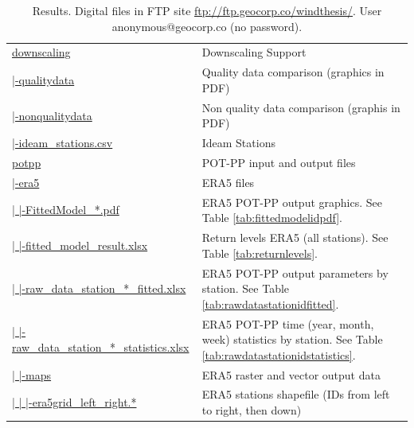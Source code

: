 \documentclass[12pt,oneside]{reedthesis}
\begin{document}
\begingroup\fontsize{8}{10}\selectfont
\begin{longtable}[t]{>{\raggedright\arraybackslash}p{2.2in}>{\raggedright\arraybackslash}p{4in}}
\caption[Results. Digital files]{\label{tab:resultsstructure}Results. Digital files in FTP site \href{ftp://ftp.geocorp.co/windthesis/}{ftp://ftp.geocorp.co/windthesis/}. User anonymous@geocorp.co (no password).}\\
\toprule
\multicolumn{1}{l}{Folder Tree - Ftp Links} & \multicolumn{1}{l}{Description}\\
\midrule
\href{ftp://ftp.geocorp.co/windthesis/downscaling/}{downscaling} & Downscaling Support\\
\href{ftp://ftp.geocorp.co/windthesis/downscaling/qualitydata/}{  |-qualitydata} & Quality data comparison (graphics in PDF)\\
\href{ftp://ftp.geocorp.co/windthesis/downscaling/nonqualitydata/}{  |-nonqualitydata} & Non quality data comparison (graphis in PDF)\\
\href{ftp://ftp.geocorp.co/windthesis/downscaling/ideam_stations.csv}{  |-ideam\_stations.csv} & Ideam Stations\\
\href{ftp://ftp.geocorp.co/windthesis/potpp/}{potpp} & POT-PP input and output files\\
\href{ftp://ftp.geocorp.co/windthesis/potpp/era5/}{  |-era5} & ERA5 files\\
\href{ftp://ftp.geocorp.co/windthesis/potpp/era5/}{  |    |-FittedModel\_*.pdf} & ERA5 POT-PP output graphics. See Table \ref{tab:fittedmodelidpdf}.\\
\href{ftp://ftp.geocorp.co/windthesis/potpp/era5/fitted_model_result_PoissonProcessGumbelIntFunc.xlsx}{  |    |-fitted\_model\_result.xlsx} & Return levels ERA5 (all stations). See Table \ref{tab:returnlevels}.\\
\href{ftp://ftp.geocorp.co/windthesis/potpp/era5/}{  |    |-raw\_data\_station\_*\_fitted.xlsx} & ERA5 POT-PP output parameters by station. See Table \ref{tab:rawdatastationidfitted}.\\
\href{ftp://ftp.geocorp.co/windthesis/potpp/era5/}{  |    |-raw\_data\_station\_*\_statistics.xlsx} & ERA5 POT-PP time (year, month, week) statistics by station. See Table \ref{tab:rawdatastationidstatistics}.\\
\href{ftp://ftp.geocorp.co/windthesis/potpp/era5/maps/}{  |    |-maps} & ERA5 raster and vector output data\\
\href{ftp://ftp.geocorp.co/windthesis/potpp/era5/maps/}{  |    |    |-era5grid\_left\_right.*} & ERA5 stations shapefile (IDs from left to right, then down)\\

\end{longtable}
\end{document}
